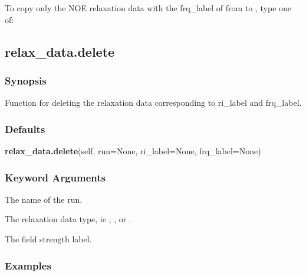 


 To copy only the NOE relaxation data with the frq\_label of  from  to , type one of: 
  



  

 \newpage 

 \subsection{relax\_data.delete} 

  
 \subsubsection{Synopsis} 

 Function for deleting the relaxation data corresponding to ri\_label and frq\_label. 
  

  
 \subsubsection{Defaults} 

 \textsf{\textbf{relax\_data.delete}(self, run=None, ri\_label=None, frq\_label=None)} 

  
 \subsubsection{Keyword Arguments} 

   The name of the run.   

   The relaxation data type, ie , , or .   

   The field strength label.  

  

  
 \subsubsection{Examples} 


